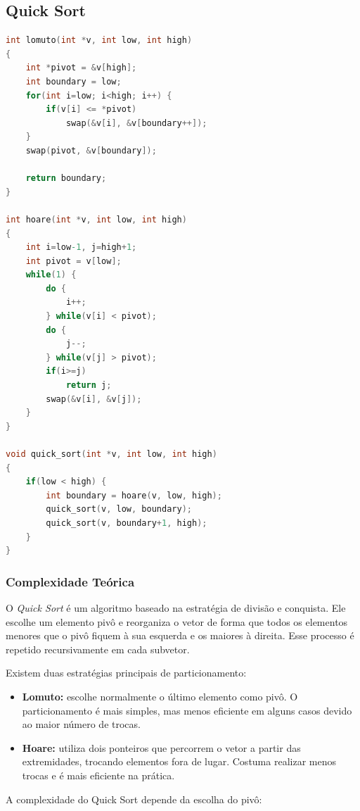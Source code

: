\subsection{Quick Sort}
\begin{lstlisting}[language=C, caption={Implementação do Quick Sort}, label={lst:quick}]
int lomuto(int *v, int low, int high)
{
    int *pivot = &v[high];
    int boundary = low;
    for(int i=low; i<high; i++) {
        if(v[i] <= *pivot)
            swap(&v[i], &v[boundary++]);
    }
    swap(pivot, &v[boundary]);

    return boundary;
}

int hoare(int *v, int low, int high)
{
    int i=low-1, j=high+1;
    int pivot = v[low];
    while(1) {
        do {
            i++;
        } while(v[i] < pivot);
        do {
            j--;
        } while(v[j] > pivot);
        if(i>=j)
            return j;
        swap(&v[i], &v[j]);
    }
}

void quick_sort(int *v, int low, int high)
{
    if(low < high) {
        int boundary = hoare(v, low, high);
        quick_sort(v, low, boundary);
        quick_sort(v, boundary+1, high);
    }
}
\end{lstlisting}

\subsubsection{Complexidade Teórica}

O \textit{Quick Sort} é um algoritmo baseado na estratégia de divisão e conquista. Ele escolhe um elemento pivô e reorganiza o vetor de forma que todos os elementos menores que o pivô fiquem à sua esquerda e os maiores à direita. Esse processo é repetido recursivamente em cada subvetor.

Existem duas estratégias principais de particionamento:

\begin{itemize}
    \item \textbf{Lomuto:} escolhe normalmente o último elemento como pivô. O particionamento é mais simples, mas menos eficiente em alguns casos devido ao maior número de trocas.
    
    \item \textbf{Hoare:} utiliza dois ponteiros que percorrem o vetor a partir das extremidades, trocando elementos fora de lugar. Costuma realizar menos trocas e é mais eficiente na prática.
\end{itemize}

A complexidade do Quick Sort depende da escolha do pivô:

